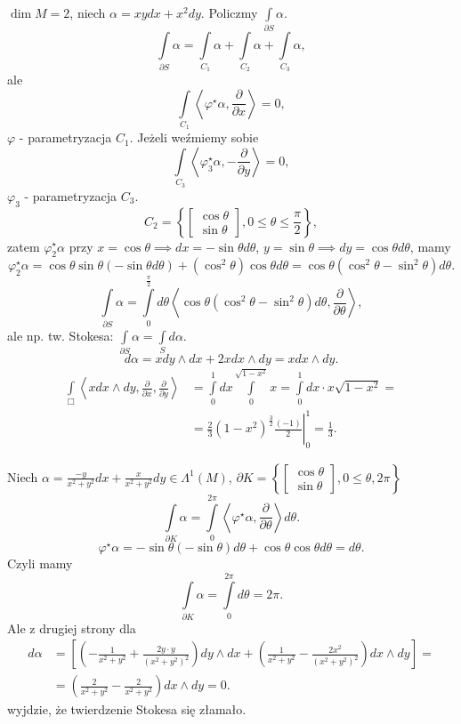 \documentclass[../main.tex]{subfiles}
\begin{document}
\begin{przyklad}
    $\dim M = 2$, niech $\alpha = xydx + x^2dy$. Policzmy $\int\limits_{\partial S}\alpha$.
    \[
    \int\limits_{\partial S}\alpha = \int\limits_{C_1}\alpha + \int\limits_{C_2}\alpha + \int\limits_{C_3}\alpha
    ,\]
ale
    \[
        \int\limits_{C_1}\left<\varphi^\star\alpha, \frac{\partial }{\partial x}  \right> = 0
    ,\]
$\varphi$ - parametryzacja $C_1$. Jeżeli weźmiemy sobie
\[
\int\limits_{C_3}\left<\varphi_3^\star\alpha, - \frac{\partial }{\partial y}  \right> = 0
,\]
$\varphi_3$ - parametryzacja $C_3$.
\[
    C_2 = \left\{ \begin{bmatrix} \cos\theta\\ \sin\theta \end{bmatrix}, 0\le \theta \le \frac{\pi}{2}  \right\}
,\]
zatem $\varphi_2^\star\alpha$ przy $x = \cos\theta \implies dx = -\sin\theta d\theta$, $y = \sin\theta \implies dy = \cos\theta d\theta$, mamy
\[
    \varphi_2^\star \alpha = \cos\theta \sin\theta(-\sin\theta d\theta) + (\cos^2\theta)\cos\theta d\theta = \cos\theta(\cos^2\theta - \sin^2\theta)d\theta
.\]
\[
    \int\limits_{\partial S}\alpha = \int\limits_0^{\frac{\pi}{2}}d\theta \left<\cos\theta(\cos^2\theta - \sin^2\theta)d\theta, \frac{\partial }{\partial \theta}  \right>
,\]
ale np. tw. Stokesa: $\int\limits_{\partial S}\alpha = \int\limits_S d\alpha$.
\[
d\alpha = xdy\land dx + 2xdx\land dy = xdx\land dy
.\]
\begin{align*}
    \int\limits_{\Box}\left<xdx\land dy, \frac{\partial }{\partial x} , \frac{\partial }{\partial y}  \right> &= \int\limits_0^1dx\int\limits_0^{\sqrt{1-x^2} } x = \int\limits_0^1dx \cdot x\sqrt{1-x^2} =\\
    &= \left.\frac{2}{3}(1-x^2)^{\frac{3}{2}}\frac{(-1)}{2}\right|_0^1 = \frac{1}{3}
.\end{align*}
\end{przyklad}
\begin{przyklad}
    Niech $\alpha = \frac{-y}{x^2+y^2}dx + \frac{x}{x^2+y^2}dy\in \Lambda^1(M)$, $\partial K = \left\{ \begin{bmatrix} \cos\theta\\ \sin\theta \end{bmatrix} , 0\le \theta, 2\pi \right\} $
    \[
        \int\limits_{\partial K}\alpha = \int\limits_0^{2\pi}\left<\varphi^\star\alpha, \frac{\partial }{\partial \theta} \right>d\theta
    .\]
\[
    \varphi^\star \alpha = -\sin\theta(-\sin\theta)d\theta + \cos\theta\cos\theta d\theta = d\theta
.\]
Czyli mamy
\[
\int\limits_{\partial K}\alpha = \int\limits_0^{2\pi}d\theta = 2\pi
.\]
Ale z drugiej strony dla
    \begin{align*}
        d\alpha &= \left[ \left( -\frac{1}{x^2+y^2} + \frac{2y\cdot y}{(x^2+y^2)^2} \right) dy\land dx + \left( \frac{1}{x^2+y^2} - \frac{2x^2}{(x^2+y^2)^2} \right) dx\land dy \right] = \\
        &= \left( \frac{2}{x^2 + y^2} - \frac{2}{x^2+y^2} \right) dx\land dy = 0
    .\end{align*}
     wyjdzie, że twierdzenie Stokesa się złamało.
\end{przyklad}
\end{document}
